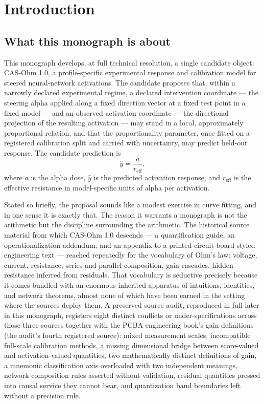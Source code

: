 \chapter{Introduction}\label{ch01:intro}

\section{What this monograph is about}\label{ch01:about}

This monograph develops, at full technical resolution, a single candidate object: CAS-Ohm 1.0, a profile-specific experimental response and calibration model for steered neural-network activations. The candidate proposes that, within a narrowly declared experimental regime, a declared intervention coordinate --- the steering alpha applied along a fixed direction vector at a fixed test point in a fixed model --- and an observed activation coordinate --- the directional projection of the resulting activation --- may stand in a local, approximately proportional relation, and that the proportionality parameter, once fitted on a registered calibration split and carried with uncertainty, may predict held-out response. The candidate prediction is
\[
\hat{y} = \frac{a}{r_{\mathrm{eff}}},
\]
where $a$ is the alpha dose, $\hat{y}$ is the predicted activation response, and $r_{\mathrm{eff}}$ is the effective resistance in model-specific units of alpha per activation.

Stated so briefly, the proposal sounds like a modest exercise in curve fitting, and in one sense it is exactly that. The reason it warrants a monograph is not the arithmetic but the discipline surrounding the arithmetic. The historical source material from which CAS-Ohm 1.0 descends --- a quantification guide, an operationalization addendum, and an appendix to a printed-circuit-board-styled engineering text --- reached repeatedly for the vocabulary of Ohm's law: voltage, current, resistance, series and parallel composition, gain cascades, hidden resistance inferred from residuals. That vocabulary is seductive precisely because it comes bundled with an enormous inherited apparatus of intuitions, identities, and network theorems, almost none of which have been earned in the setting where the sources deploy them. A preserved source audit, reproduced in full later in this monograph, registers eight distinct conflicts or under-specifications across those three sources together with the PCBA engineering book's gain definitions (the audit's fourth registered source): mixed measurement scales, incompatible full-scale calibration methods, a missing dimensional bridge between score-valued and activation-valued quantities, two mathematically distinct definitions of gain, a mnemonic classification axis overloaded with two independent meanings, network composition rules asserted without validation, residual quantities pressed into causal service they cannot bear, and quantization band boundaries left without a precision rule.

